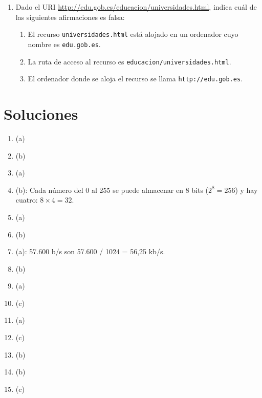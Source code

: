 \begin{enumerate}
\item Dado el URI \url{http://edu.gob.es/educacion/universidades.html}, indica cuál de las siguientes afirmaciones es falsa: \begin{enumerate} \item El recurso \texttt{universidades.html} está alojado en un ordenador cuyo nombre es \texttt{edu.gob.es}. \item La ruta de acceso al recurso es \texttt{educacion/universidades.html}. \item El ordenador donde se aloja el recurso se llama \texttt{http://edu.gob.es}. \end{enumerate} \end{enumerate} 

\section{Soluciones} \begin{enumerate} \item (a) \item (b) \item (a) \item (b): Cada número del 0 al 255 se puede almacenar en 8 bits ($2^8=256$) y hay cuatro: $8\times 4=32$. \item (a) 

\item (b) \item (a): 57.600 b/s son 57.600 / 1024 = 56,25 kb/s. \item (b) \item (a) \item (c) 

\item (a) \item (c) \item (b) \item (b) \item (c) 

\end{enumerate} 
